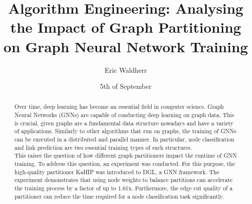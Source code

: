 \documentclass[acmsmall,nonacm,screen,review]{acmart}
\title{Algorithm Engineering: Analysing the Impact of Graph Partitioning on Graph Neural Network Training}
\author{Eric Waldherr}
\affiliation{%
  \institution{Heidelberg University}
  \streetaddress{Im Neuenheimer Feld 205}
  \city{Heidelberg}
  \state{Baden-Württemberg}
  \country{Germany}
  \postcode{69120}
}
\date{5th of September}
\begin{document}
\begin{abstract}
Over time, deep learning has become an essential field in computer science. Graph Neural Networks (GNNs) are capable of conducting deep learning on graph data. This is crucial, given graphs are a fundamental data structure nowadays and have a variety of applications. Similarly to other algorithms that run on graphs, the training of GNNs can be executed in a distributed and parallel manner. In particular, node classification and link prediction are two essential training types of such structures.\\
This raises the question of how different graph partitioners impact the runtime of GNN training. To address this question, an experiment was conducted. For this purpose, the high-quality partitioner KaHIP was introduced to DGL, a GNN framework. The experiment demonstrates that using node weights to balance partitions can accelerate the training process by a factor of up to 1.61x. Furthermore, the edge cut quality of a partitioner can reduce the time required for a node classification task significantly.
\end{abstract}
\maketitle
\end{document}
